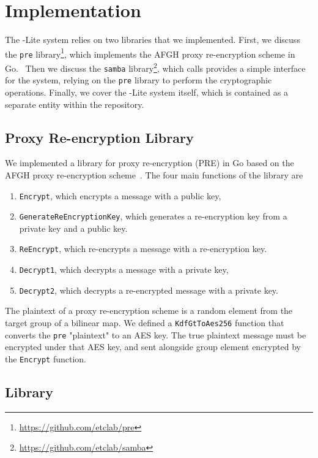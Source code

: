 \section{Implementation}
\label{sec:implementation}

The \SystemName-Lite system relies on two libraries that we implemented. First, we discuss the \texttt{pre} library\footnote{\url{https://github.com/etclab/pre}},
which implements the AFGH proxy re-encryption scheme in Go.~\cite{05-ndss-improved_proxy_reencryption}
Then we discuss the \texttt{samba} library\footnote{\url{https://github.com/etclab/samba}}, which calls provides a simple interface for the \SystemName system, relying on the \texttt{pre} library to perform the cryptographic operations.
Finally, we cover the \SystemName-Lite system itself, which is contained as a separate entity within the \SystemName repository.

\subsection{Proxy Re-encryption Library}
\label{sec:PRE}
%
We implemented a library for proxy re-encryption (PRE) in Go based on the AFGH proxy re-encryption scheme~\cite{05-ndss-improved_proxy_reencryption}.
The four main functions of the library are 
\begin{enumerate}
	\item \texttt{Encrypt}, which encrypts a message with a public key,
	\item \texttt{GenerateReEncryptionKey}, which generates a re-encryption key from a private key and a public key.
	\item \texttt{ReEncrypt}, which re-encrypts a message with a re-encryption key.
	\item \texttt{Decrypt1}, which decrypts a message with a private key,
	\item \texttt{Decrypt2}, which decrypts a re-encrypted message with a private key.
\end{enumerate}

The plaintext of a proxy re-encryption scheme is a random element from the target group of a bilinear map.
We defined a \texttt{KdfGtToAes256} function that converts the \texttt{pre} "plaintext" to an AES key.
The true plaintext message must be encrypted under that AES key, and sent alongside group element encrypted by the \texttt{Encrypt} function.

\subsection{\SystemName Library}

